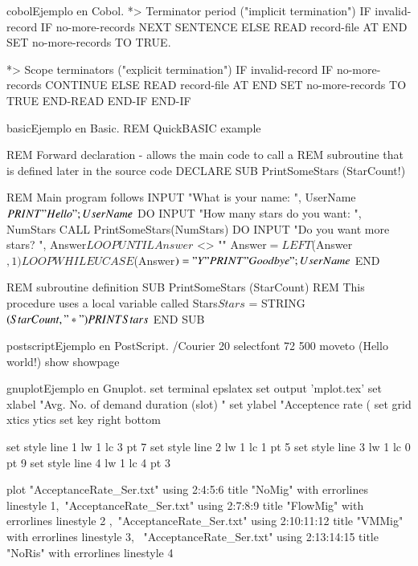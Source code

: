 \begin{sourcecode}{cobol}{Ejemplo en Cobol.}
*> Terminator period ("implicit termination")
IF invalid-record
    IF no-more-records
        NEXT SENTENCE
    ELSE
        READ record-file
            AT END SET no-more-records TO TRUE.

*> Scope terminators ("explicit termination")
IF invalid-record
    IF no-more-records
        CONTINUE
    ELSE
        READ record-file
            AT END SET no-more-records TO TRUE
        END-READ
    END-IF
END-IF
\end{sourcecode}

\begin{sourcecode}{basic}{Ejemplo en Basic.}
REM QuickBASIC example

REM Forward declaration - allows the main code to call a
REM    subroutine that is defined later in the source code
DECLARE SUB PrintSomeStars (StarCount!)

REM Main program follows
INPUT "What is your name: ", UserName$
PRINT "Hello "; UserName$
DO
   INPUT "How many stars do you want: ", NumStars
   CALL PrintSomeStars(NumStars)
   DO
      INPUT "Do you want more stars? ", Answer$
   LOOP UNTIL Answer$ <> ""
   Answer$ = LEFT$(Answer$, 1)
LOOP WHILE UCASE$(Answer$) = "Y"
PRINT "Goodbye "; UserName$
END

REM subroutine definition
SUB PrintSomeStars (StarCount)
   REM This procedure uses a local variable called Stars$
   Stars$ = STRING$(StarCount, "*")
   PRINT Stars$
END SUB
\end{sourcecode}

\begin{sourcecode}{postscript}{Ejemplo en PostScript.}
 /Courier             %
 20 selectfont        %
 72 500 moveto        %
 (Hello world!) show  %
 showpage             %
\end{sourcecode}

\begin{sourcecode}{gnuplot}{Ejemplo en Gnuplot.}
set terminal epslatex   
set output 'mplot.tex'   
set xlabel "Avg. No. of demand duration (slot) "   
set ylabel "Acceptence rate (%
set grid xtics ytics   
set key right bottom   

set style line 1 lw 1 lc 3 pt 7  
set style line 2 lw 1 lc 1 pt 5  
set style line 3 lw 1 lc 0 pt 9  
set style line 4 lw 1 lc 4 pt 3  

plot "AcceptanceRate_Ser.txt" using 2:4:5:6 title "NoMig" with errorlines linestyle 1,\ 
     "AcceptanceRate_Ser.txt" using 2:7:8:9 title "FlowMig" with errorlines linestyle 2 ,\ 
      "AcceptanceRate_Ser.txt" using 2:10:11:12 title "VMMig" with errorlines linestyle 3, \ 
     "AcceptanceRate_Ser.txt" using 2:13:14:15 title "NoRis" with errorlines linestyle 4
\end{sourcecode}

